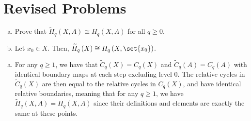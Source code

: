 \documentclass[10pt]{mypackage}
\begin{document}
\RaggedRight
\section{Revised Problems}%
\begin{problem}[Problem 1]\hfill
  \begin{enumerate}[(a)]
    \item Prove that $ \widetilde{H}_q\left( X,A \right) \cong H_q\left( X,A \right)$ for all $q\geq 0$.
    \item Let $x_0\in X$. Then, $ \widetilde{H}_q\left( X \right)\cong H_q\left( X,\set{x_0} \right) $.
  \end{enumerate}
\end{problem}
\begin{solution}\hfill
  \begin{enumerate}[(a)]
    \item For any $q\geq 1$, we have that $ \widetilde{C}_q\left( X \right) = C_q(X) $ and $ \widetilde{C}_q(A) = C_q(A) $ with identical boundary maps at each step excluding level $0$. The relative cycles in $ \widetilde{C}_q\left( X \right) $ are then equal to the relative cycles in $ C_q(X) $, and have identical relative boundaries, meaning that for any $q\geq 1$, we have $\widetilde{H}_q\left( X,A \right) = H_q\left( X,A \right)$ since their definitions and elements are exactly the same at these points.


\end{enumerate}
\end{solution}
\end{document}
